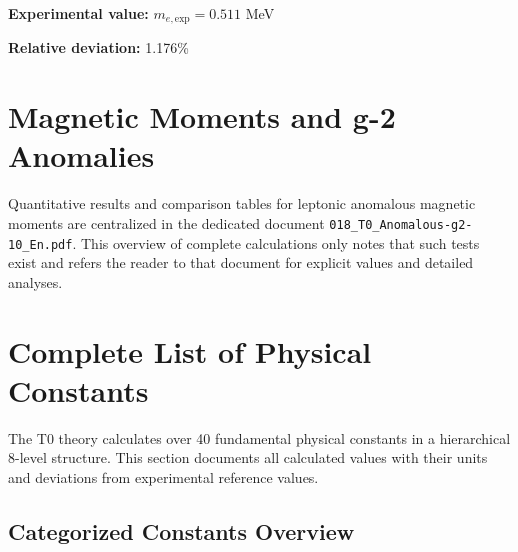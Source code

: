 	\textbf{Experimental value:} $m_{e,\text{exp}} = 0.511$ MeV
	
	\textbf{Relative deviation:} 1.176\%
	
	\section{Magnetic Moments and g-2 Anomalies}
	
	Quantitative results and comparison tables for leptonic anomalous magnetic moments are centralized in the dedicated document \texttt{018\_T0\_Anomalous-g2-10\_En.pdf}. This overview of complete calculations only notes that such tests exist and refers the reader to that document for explicit values and detailed analyses.
	
	\section{Complete List of Physical Constants}
	
	The T0 theory calculates over 40 fundamental physical constants in a hierarchical 8-level structure. This section documents all calculated values with their units and deviations from experimental reference values.
	
	\subsection{Categorized Constants Overview}
	
	\begin{table}[h]
		\centering
		\caption{Category-based error statistics of T0 constant calculations}
	\end{table}
	
